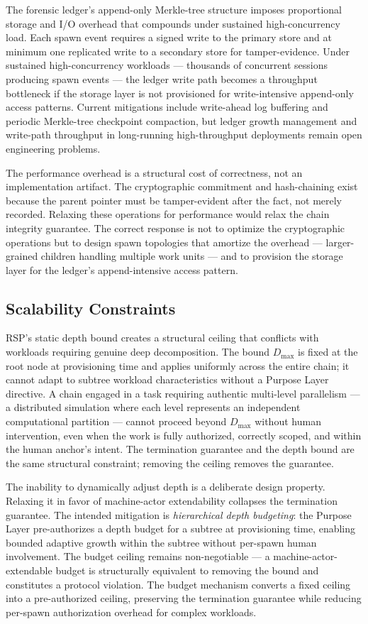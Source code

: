 The forensic ledger's append-only Merkle-tree structure imposes proportional storage and I/O overhead that compounds under sustained high-concurrency load. Each spawn event requires a signed write to the primary store and at minimum one replicated write to a secondary store for tamper-evidence. Under sustained high-concurrency workloads — thousands of concurrent sessions producing spawn events — the ledger write path becomes a throughput bottleneck if the storage layer is not provisioned for write-intensive append-only access patterns. Current mitigations include write-ahead log buffering and periodic Merkle-tree checkpoint compaction, but ledger growth management and write-path throughput in long-running high-throughput deployments remain open engineering problems.

The performance overhead is a structural cost of correctness, not an implementation artifact. The cryptographic commitment and hash-chaining exist because the parent pointer must be tamper-evident after the fact, not merely recorded. Relaxing these operations for performance would relax the chain integrity guarantee. The correct response is not to optimize the cryptographic operations but to design spawn topologies that amortize the overhead — larger-grained children handling multiple work units — and to provision the storage layer for the ledger's append-intensive access pattern.

\subsection{Scalability Constraints}
\label{sec:rs-scalability}

RSP's static depth bound creates a structural ceiling that conflicts with workloads requiring genuine deep decomposition. The bound $D_{\max}$ is fixed at the root node at provisioning time and applies uniformly across the entire chain; it cannot adapt to subtree workload characteristics without a Purpose Layer directive. A chain engaged in a task requiring authentic multi-level parallelism — a distributed simulation where each level represents an independent computational partition — cannot proceed beyond $D_{\max}$ without human intervention, even when the work is fully authorized, correctly scoped, and within the human anchor's intent. The termination guarantee and the depth bound are the same structural constraint; removing the ceiling removes the guarantee.

The inability to dynamically adjust depth is a deliberate design property. Relaxing it in favor of machine-actor extendability collapses the termination guarantee. The intended mitigation is \emph{hierarchical depth budgeting}: the Purpose Layer pre-authorizes a depth budget for a subtree at provisioning time, enabling bounded adaptive growth within the subtree without per-spawn human involvement. The budget ceiling remains non-negotiable — a machine-actor-extendable budget is structurally equivalent to removing the bound and constitutes a protocol violation. The budget mechanism converts a fixed ceiling into a pre-authorized ceiling, preserving the termination guarantee while reducing per-spawn authorization overhead for complex workloads.

